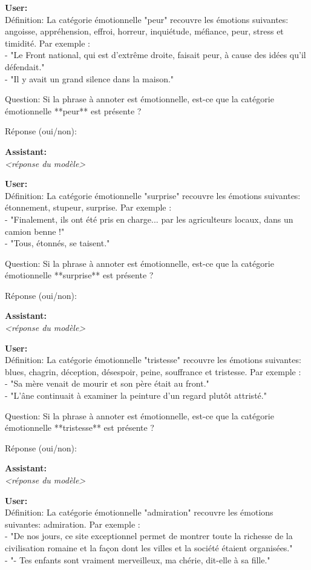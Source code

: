 {\textbf{User:}\\
Définition: La catégorie émotionnelle "peur" recouvre les émotions suivantes: angoisse, appréhension, effroi, horreur, inquiétude, méfiance, peur, stress et timidité. Par exemple :\\
- "Le Front national, qui est d'extrême droite, faisait peur, à cause des idées qu'il défendait."\\
- "Il y avait un grand silence dans la maison."

Question: Si la phrase à annoter est émotionnelle, est-ce que la catégorie émotionnelle **peur** est présente ?

Réponse (oui/non):

\textbf{Assistant:}\\
\textit{<réponse du modèle>}

\textbf{User:}\\
Définition: La catégorie émotionnelle "surprise" recouvre les émotions suivantes: étonnement, stupeur, surprise. Par exemple :\\
- "Finalement, ils ont été pris en charge... par les agriculteurs locaux, dans un camion benne !"\\
- "Tous, étonnés, se taisent."

Question: Si la phrase à annoter est émotionnelle, est-ce que la catégorie émotionnelle **surprise** est présente ?

Réponse (oui/non):

\textbf{Assistant:}\\
\textit{<réponse du modèle>}

\textbf{User:}\\
Définition: La catégorie émotionnelle "tristesse" recouvre les émotions suivantes: blues, chagrin, déception, désespoir, peine, souffrance et tristesse. Par exemple :\\
- "Sa mère venait de mourir et son père était au front."\\
- "L'âne continuait à examiner la peinture d'un regard plutôt attristé."

Question: Si la phrase à annoter est émotionnelle, est-ce que la catégorie émotionnelle **tristesse** est présente ?

Réponse (oui/non):

\textbf{Assistant:}\\
\textit{<réponse du modèle>}

\textbf{User:}\\
Définition: La catégorie émotionnelle "admiration" recouvre les émotions suivantes: admiration. Par exemple :\\
- "De nos jours, ce site exceptionnel permet de montrer toute la richesse de la civilisation romaine et la façon dont les villes et la société étaient organisées."\\
- "- Tes enfants sont vraiment merveilleux, ma chérie, dit-elle à sa fille."

}
